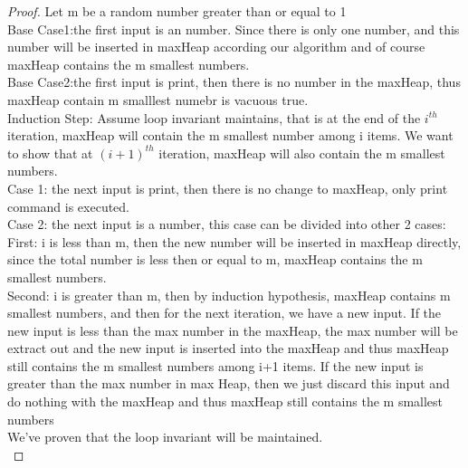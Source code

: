 \documentclass[11pt]{article}
\begin{document}
\begin{proof}
Let m be a random number greater than or equal to 1\\
Base Case1:the first input is an number. Since there is only one number, and this number will be inserted in maxHeap according our algorithm and of course maxHeap contains the m smallest numbers.\\
Base Case2:the first input is print, then there is no number in the maxHeap, thus maxHeap contain m smalllest numebr is vacuous true.\\
Induction Step: Assume loop invariant maintains, that is at the end of the $i^{th}$ iteration, maxHeap will contain the m smallest number among i items. We want to show that at $(i+1)^{th}$ iteration, maxHeap will also contain the m smallest numbers.\\
Case 1: the next input is print, then there is no change to maxHeap, only print command is executed.\\
Case 2: the next input is a number, this case can be divided into other 2 cases:\\
First: i is less than m, then the new number will be inserted in maxHeap directly, since the total number is less then or equal to m, maxHeap contains the m smallest numbers.\\
Second: i is greater than m, then by induction hypothesis, maxHeap contains m smallest numbers, and then for the next iteration, we have a new input. If the new input is less than the max number in the maxHeap, the max number will be extract out and the new input is inserted into the maxHeap and thus maxHeap still contains the m smallest numbers among i+1 items. If the new input is greater than the max number in max Heap, then we just discard this input and do nothing with the maxHeap and thus maxHeap still contains the m smallest numbers\\
We've proven that the loop invariant will be maintained.\\
\end{proof}
\end{document}
